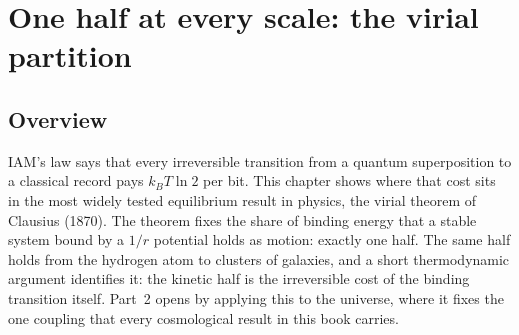 \providecommand{\authorhold}[1]{\par\smallskip\noindent\fbox{\parbox{0.95\linewidth}{\small\textbf{Author hold.} #1}}\par\smallskip}

\chapter{One half at every scale: the virial partition}\label{ch:virial_law}

\section*{Overview}
IAM's law says that every irreversible transition from a quantum superposition to a classical record pays $k_BT\ln2$ per bit. This chapter shows where that
cost sits in the most widely tested equilibrium result in physics, the virial theorem of Clausius (1870). The theorem fixes the share of binding energy that a
stable system bound by a $1/r$ potential holds as motion: exactly one half. The same half holds from the hydrogen atom to clusters of galaxies, and a short
thermodynamic argument identifies it: the kinetic half is the irreversible cost of the binding transition itself. Part~2 opens by applying this to the universe,
where it fixes the one coupling that every cosmological result in this book carries.

